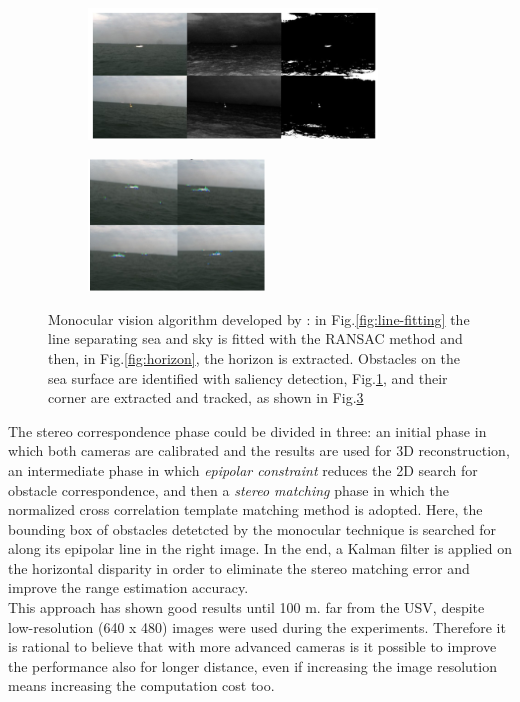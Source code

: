 \documentclass[12pt]{article}
\begin{document}
\begin{figure}
                  \begin{subfigure}[b]{.40\linewidth}
                  \includegraphics[width=\linewidth, height= 3.5cm]{./Images/Wang/saliency}
                  \caption{}\label{fig:saliency}
                  \end{subfigure}
                  \begin{subfigure}[b]{.40\linewidth}
                  \includegraphics[width=\linewidth, height= 3.5cm]{./Images/Wang/corner}
                  \caption{}\label{fig:corner}
                  \end{subfigure}
                  \caption{Monocular vision algorithm developed by \textcite{Wang2011}: in Fig.\ref{fig:line-fitting} the line separating sea and sky is fitted with the RANSAC method and then, in Fig.\ref{fig:horizon}, the horizon is extracted. Obstacles on the sea surface are identified with saliency detection, Fig.\ref{fig:saliency}, and their corner are extracted and tracked, as shown in Fig.\ref{fig:corner}}
            \end{figure}

      \indent The stereo correspondence phase could be divided in three: an initial phase in which both cameras are calibrated and the results are used for 3D reconstruction, an intermediate phase in which \textit{epipolar constraint} reduces the 2D search for obstacle correspondence, and then a \textit{stereo matching} phase in which the normalized cross correlation template matching method is adopted. Here, the bounding box of obstacles detetcted by the monocular technique is searched for along its epipolar line in the right image. In the end, a Kalman filter is applied on the horizontal disparity in order to eliminate the stereo matching error and improve the range estimation accuracy.\\
      This approach has shown good results until 100 m. far from the USV, despite low-resolution (640 x 480) images were used during the experiments. Therefore it is rational to believe that with more advanced cameras is it possible to improve the performance also for longer distance, even if increasing the image resolution means increasing the computation cost too.
\end{document}
